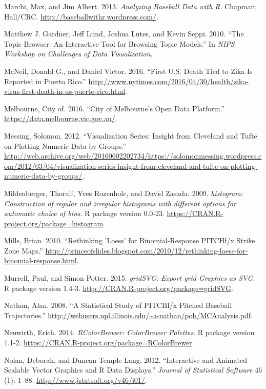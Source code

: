 \documentclass[12pt,]{isuthesis}
\begin{document}
\hypertarget{ref-baseball}{}
Marchi, Max, and Jim Albert. 2013. \emph{Analyzing Baseball Data with
R}. Chapman; Hall/CRC. \url{http://baseballwithr.wordpress.com/}.

\hypertarget{ref-Gardner}{}
Matthew J. Gardner, Jeff Lund, Joshua Lutes, and Kevin Seppi. 2010.
``The Topic Browser: An Interactive Tool for Browsing Topic Models.'' In
\emph{NIPS Workshop on Challenges of Data Visualization}.

\hypertarget{ref-zika-nyt}{}
McNeil, Donald G., and Daniel Victor. 2016. ``First U.S. Death Tied to
Zika Is Reported in Puerto Rico.''
\url{http://www.nytimes.com/2016/04/30/health/zika-virus-first-death-in-us-puerto-rico.html}.

\hypertarget{ref-melbourne}{}
Melbourne, City of. 2016. ``City of Melbourne's Open Data Platform.''
\url{https://data.melbourne.vic.gov.au/}.

\hypertarget{ref-messing}{}
Messing, Solomon. 2012. ``Visualization Series: Insight from Cleveland
and Tufte on Plotting Numeric Data by Groups.''
\url{http://web.archive.org/web/20160602202734/https://solomonmessing.wordpress.com/2012/03/04/visualization-series-insight-from-cleveland-and-tufte-on-plotting-numeric-data-by-groups/}.

\hypertarget{ref-histogram}{}
Mildenberger, Thoralf, Yves Rozenholc, and David Zasada. 2009.
\emph{histogram: Construction of regular and irregular histograms with
different options for automatic choice of bins}. R package version
0.0-23. \url{https://CRAN.R-project.org/package=histogram}.

\hypertarget{ref-loess}{}
Mills, Brian. 2010. ``Rethinking 'Loess' for Binomial-Response PITCHf/x
Strike Zone Maps.''
\url{http://princeofslides.blogspot.com/2010/12/rethinking-loess-for-binomial-response.html}.

\hypertarget{ref-gridSVG}{}
Murrell, Paul, and Simon Potter. 2015. \emph{gridSVG: Export grid
Graphics as SVG}. R package version 1.4-3.
\url{http://CRAN.R-project.org/package=gridSVG}.

\hypertarget{ref-trajecoryAnalysis}{}
Nathan, Alan. 2008. ``A Statistical Study of PITCHf/x Pitched Baseball
Trajectories.''
\url{http://webusers.npl.illinois.edu/~a-nathan/pob/MCAnalysis.pdf}.

\hypertarget{ref-RColorBrewer}{}
Neuwirth, Erich. 2014. \emph{RColorBrewer: ColorBrewer Palettes}. R
package version 1.1-2.
\url{https://CRAN.R-project.org/package=RColorBrewer}.

\hypertarget{ref-SVGAnnotation}{}
Nolan, Deborah, and Duncan Temple Lang. 2012. ``Interactive and Animated
Scalable Vector Graphics and R Data Displays.'' \emph{Journal of
Statistical Software} 46 (1): 1--88.
\url{http://www.jstatsoft.org/v46/i01/}.
\end{document}
